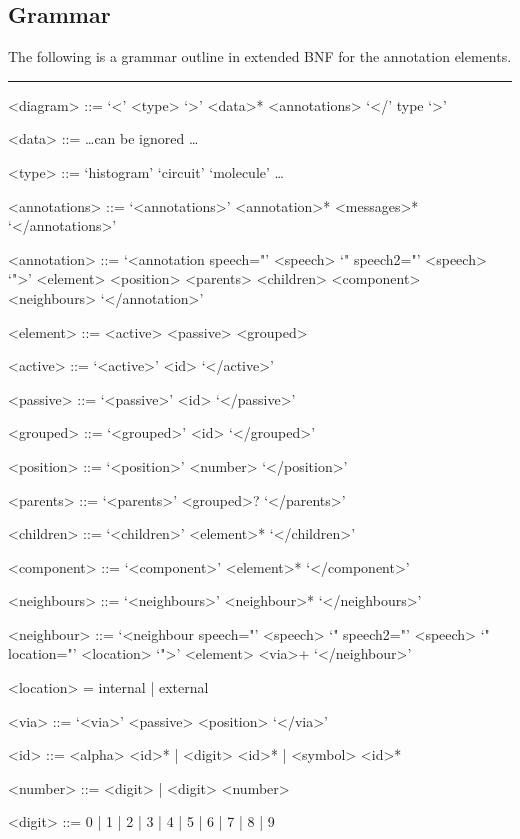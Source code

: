 \documentclass{article}
\begin{document}
\newpage

\subsection*{Grammar}

The following is a grammar outline in extended BNF for the annotation elements.
\vspace{.5cm}
\hrule

\begin{grammar}\setlength{\parskip}{5pt}
  <diagram> ::= `<' <type> `>' <data>* <annotations>  `</' type `>'

  <data> ::= \ldots can be ignored \ldots
  
  <type>  ::= `histogram'
  \alt `circuit'
  \alt `molecule'
  \alt \ldots
  
  
  <annotations> ::= `<annotations>' <annotation>* <messages>* `</annotations>'

  <annotation> ::= `<annotation speech="' <speech> `" speech2="' <speech> `">'
  <element> <position> <parents> <children> <component> <neighbours> `</annotation>'

  <element> ::= <active>
  \alt <passive>
  \alt <grouped>

  <active> ::=  `<active>' <id> `</active>'

  <passive> ::= `<passive>' <id> `</passive>'
  
  <grouped> ::= `<grouped>' <id> `</grouped>'

  <position> ::= `<position>' <number> `</position>'

  <parents> ::= `<parents>' <grouped>? `</parents>'

  <children> ::= `<children>' <element>* `</children>'

  <component> ::= `<component>' <element>* `</component>'

  <neighbours> ::= `<neighbours>' <neighbour>* `</neighbours>'

  <neighbour> ::= `<neighbour speech="' <speech> `" speech2="' <speech> `" location="' <location> `">' <element> <via>+ `</neighbour>'

  <location> = internal | external
  
  <via> ::= `<via>' <passive> <position> `</via>'

  <id> ::= <alpha> <id>* | <digit> <id>* | <symbol> <id>*

  <number> ::= <digit> | <digit> <number>

  <digit> ::= 0 | 1 | 2 | 3 | 4 | 5 | 6 | 7 | 8 | 9


\end{grammar}
\end{document}
